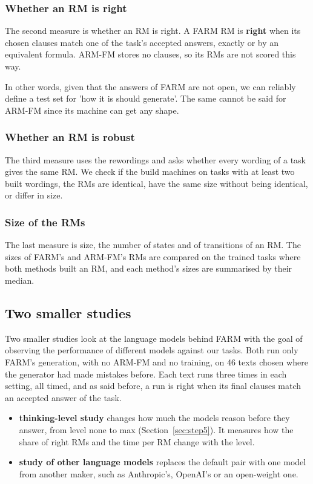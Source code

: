 \documentclass[11pt,english,listoffigures,listoftables]{tfgetsinf}
\begin{document}
\subsubsection{Whether an RM is right}
The second measure is whether an RM is right. A FARM RM is \textbf{right} when its chosen clauses match one of the task's accepted answers, exactly or by an equivalent formula. ARM-FM stores no clauses, so its RMs are not scored this way. 

In other words, given that the answers of FARM are not open, we can reliably define a test set for 'how it is should generate'. The same cannot be said for ARM-FM since its machine can get any shape.

\subsubsection{Whether an RM is robust}
The third measure uses the rewordings and asks whether every wording of a task gives the same RM. We check if the build machines on tasks with at least two built wordings, the RMs are identical, have the same size without being identical, or differ in size.

\subsubsection{Size of the RMs}
\label{sec:eval-size}The last measure is size, the number of states and of transitions of an RM. The sizes of FARM's and ARM-FM's RMs are compared on the trained tasks where both methods built an RM, and each method's sizes are summarised by their median.

\subsection{Two smaller studies}
Two smaller studies look at the language models behind FARM with the goal of observing the performance of different models against our tasks. Both run only FARM's generation, with no ARM-FM and no training, on 46 texts chosen where the generator had made mistakes before. Each text runs three times in each setting, all timed, and as said before, a run is right when its final clauses match an accepted answer of the task.

\begin{itemize}
    \item \textbf{thinking-level study} changes how much the models reason before they answer, from level none to max (Section~\ref{sec:step5}). It measures how the share of right RMs and the time per RM change with the level.
    \item \textbf{study of other language models} replaces the default pair with one model from another maker, such as Anthropic's, OpenAI's or an open-weight one. 
\end{itemize}
\end{document}
